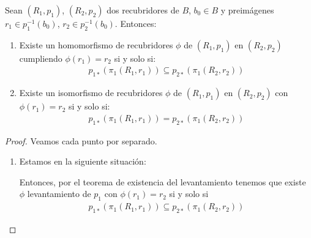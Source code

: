 \begin{coro}
    Sean $(R_1,p_1)$, $(R_2, p_2)$ dos recubridores de $B$, $b_0\in B$ y preimágenes $r_1\in p_{1}^{-1}(b_0)$, $r_2\in p_2^{-1}(b_0)$. Entonces:
    \begin{enumerate}
        \item Existe un homomorfismo de recubridores $\phi$ de $(R_1,p_1)$ en $(R_2, p_2)$ cumpliendo $\phi(r_1)=r_2$ si y solo si:
        \begin{gather*}
            p_{1*}(\pi_1(R_1,r_1)) \subseteq p_{2*}(\pi_1(R_2,r_2))
        \end{gather*}

        \item Existe un isomorfismo de recubridores $\phi$ de $(R_1,p_1)$ en $(R_2, p_2)$ con $\phi(r_1)=r_2$ si y solo si:
        \begin{gather*}
            p_{1*}(\pi_1(R_1,r_1)) = p_{2*}(\pi_1(R_2,r_2))
        \end{gather*}
    \end{enumerate}

    \begin{proof}
        Veamos cada punto por separado.
        \begin{enumerate}
            \item Estamos en la siguiente situación:
            \begin{center}
            \end{center}
            
            Entonces, por el teorema de existencia del levantamiento tenemos que existe $\phi$ levantamiento de $p_1$ con $\phi(r_1) = r_2$ si y solo si 
            \begin{gather*}
                p_{1*}(\pi_1(R_1,r_1)) \subseteq p_{2*}(\pi_1(R_2,r_2))
            \end{gather*}


\end{enumerate}
\end{proof}
\end{coro}
